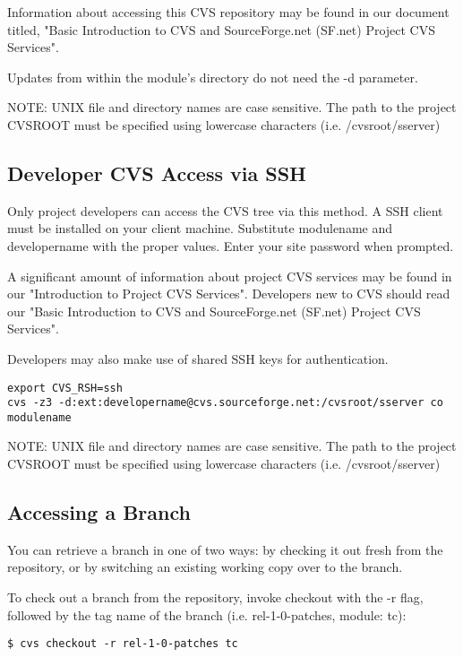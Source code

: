Information about accessing this CVS repository may be found in our document titled, 
"Basic Introduction to CVS and SourceForge.net (SF.net) Project CVS Services".

Updates from within the module's directory do not need the -d parameter.

NOTE: UNIX file and directory names are case sensitive. 
The path to the project CVSROOT must be specified using lowercase characters (i.e. /cvsroot/sserver)


\subsection{Developer CVS Access via SSH}

Only project developers can access the CVS tree via this method. 
A SSH client must be installed on your client machine. Substitute modulename 
and developername with the proper values. Enter your site password when prompted.

A significant amount of information about project CVS services may be found in our 
"Introduction to Project CVS Services". Developers new to CVS should read our 
"Basic Introduction to CVS and SourceForge.net (SF.net) Project CVS Services".

Developers may also make use of shared SSH keys for authentication.

\begin{verbatim}
export CVS_RSH=ssh
cvs -z3 -d:ext:developername@cvs.sourceforge.net:/cvsroot/sserver co modulename
\end{verbatim}

NOTE: UNIX file and directory names are case sensitive. 
The path to the project CVSROOT must be specified using lowercase characters (i.e. /cvsroot/sserver)

\subsection{Accessing a Branch}
You can retrieve a branch in one of two ways: by checking it out fresh from the repository, or by switching an existing working copy over to the branch.

To check out a branch from the repository, invoke checkout with the -r flag, followed by the tag name of the branch (i.e. rel-1-0-patches, module: tc):

\begin{verbatim}
$ cvs checkout -r rel-1-0-patches tc
\end{verbatim}

